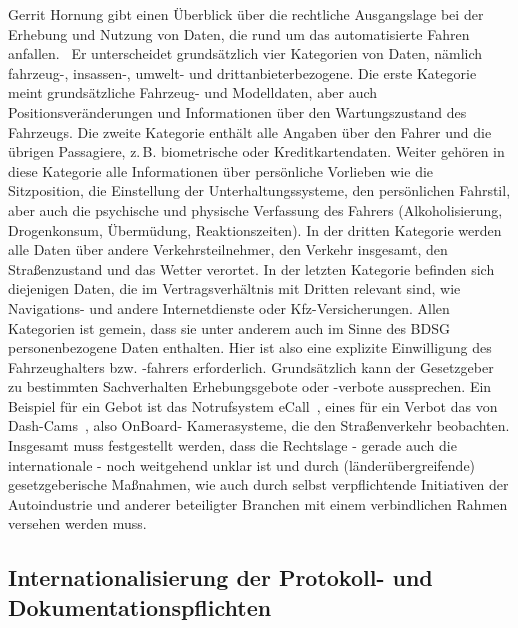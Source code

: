\documentclass[twoside,a4paper,12pt]{article}
\begin{document}
Gerrit Hornung gibt einen Überblick über die rechtliche Ausgangslage bei der Erhebung und Nutzung von Daten, die rund um das automatisierte Fahren
anfallen.~\cite{ho} Er unterscheidet grundsätzlich vier Kategorien von Daten, nämlich fahrzeug-, insassen-, umwelt- und 
drittanbieterbezogene. Die erste Kategorie meint grundsätzliche Fahrzeug- und Modelldaten, aber auch Positionsveränderungen und Informationen über den
Wartungszustand des Fahrzeugs. Die zweite Kategorie enthält alle Angaben über den Fahrer und die übrigen Passagiere, z.\,B. biometrische oder Kreditkartendaten.
Weiter gehören in diese Kategorie alle Informationen über persönliche Vorlieben wie die Sitzposition, die Einstellung der Unterhaltungssysteme, den
persönlichen Fahrstil, aber auch die psychische und physische Verfassung des Fahrers (Alkoholisierung, Drogenkonsum, Übermüdung, Reaktionszeiten).
In der dritten Kategorie werden alle Daten über andere Verkehrsteilnehmer, den Verkehr insgesamt, den Straßenzustand und das Wetter verortet.
In der letzten Kategorie befinden sich diejenigen Daten, die im Vertragsverhältnis mit Dritten relevant sind, wie Navigations- und andere Internetdienste oder
Kfz-Versicherungen.
Allen Kategorien ist gemein, dass sie unter anderem auch im Sinne des BDSG personenbezogene Daten enthalten. Hier ist also eine explizite Einwilligung
des Fahrzeughalters bzw. -fahrers erforderlich. Grundsätzlich kann der Gesetzgeber zu bestimmten Sachverhalten Erhebungsgebote oder -verbote aussprechen.
Ein Beispiel für ein Gebot ist das Notrufsystem eCall\mbox{~\cite[S. 362]{ho}}, eines für ein Verbot das von Dash-Cams\mbox{~\cite[S. 363]{ho}}, also OnBoard-
Kamerasysteme, die den Straßenverkehr beobachten. Insgesamt muss festgestellt werden, dass die Rechtslage - gerade auch die internationale - noch weitgehend 
unklar ist und durch (länderübergreifende) gesetzgeberische Maßnahmen, wie auch durch selbst verpflichtende Initiativen der Autoindustrie und anderer beteiligter 
Branchen mit einem verbindlichen Rahmen versehen werden muss.\\

\subsection{Internationalisierung der Protokoll- und Dokumentationspflichten} \label{InternationaleStandardisierungDerProtokollUndDokumentationspflichten}
\end{document}
